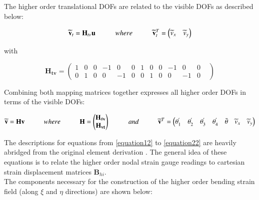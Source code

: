 The higher order translational DOFs are related to the visible DOFs as described below:

\begin{equation} 
\widetilde{\mathbf{v}}_t = \mathbf{H}_{tv} \mathbf{u}
\hspace{10mm}
where
\hspace{10mm}
\widetilde{\mathbf{v}}_t^T = 
\begin{pmatrix}
\widetilde{v}_x & \widetilde{v}_y
\end{pmatrix}
\label{equationv_t}
\end{equation}

with

\begin{equation} 
\mathbf{H_{tv}} =
\begin{pmatrix}
1 & 0 & 0 & -1 & 0 & 0 & 1 & 0 & 0 & -1 & 0 & 0 \\
0 & 1 & 0 & 0 & -1 & 0 & 0 & 1 & 0 & 0 & -1 & 0 & 
\end{pmatrix}
\label{equation10}
\end{equation}

Combining both mapping matrices together expresses all higher order DOFs in terms of the visible DOFs:

\begin{equation} 
\widetilde{\mathbf{v}} = \mathbf{H v}
\hspace{10mm}
where
\hspace{10mm}
\mathbf{H} =
\begin{pmatrix}
\mathbf{H_{\theta v}} \\
\mathbf{H_{vt}}
\end{pmatrix}
\hspace{10mm}
and
\hspace{10mm}
\widetilde{\mathbf{v}}^T = 
\begin{pmatrix}
\theta_1^{'} & \theta_2^{'} & \theta_3^{'} & \theta_4^{'} & \bar{\theta} &  \widetilde{v}_x & \widetilde{v}_y
\end{pmatrix}
\label{equation11}
\end{equation}

The descriptions for equations from \eqref{equation12} to \eqref{equation22} are heavily abridged from the original element derivation \cite{Hau94}. The general idea of these equations is to relate the higher order nodal strain gauge readings to cartesian strain displacement matrices $\mathbf{B}_{hi}$.\\

The components necessary for the construction of the higher order bending strain field (along $\xi$ and $\eta$ directions) are shown below:

